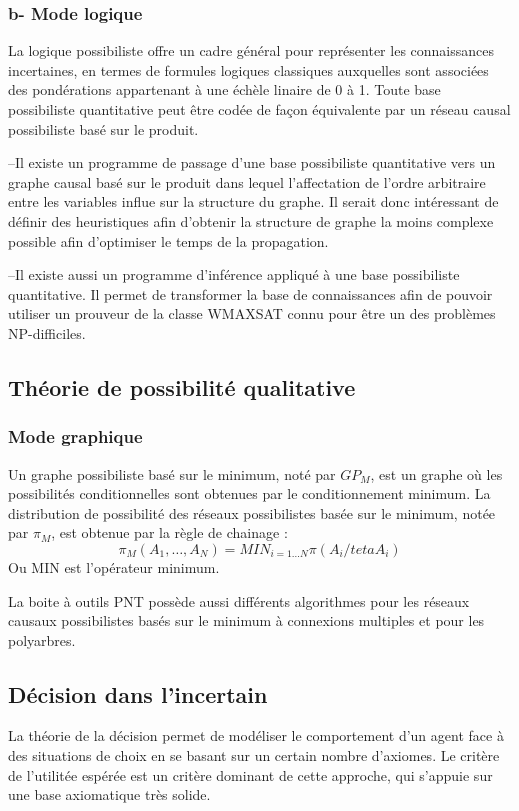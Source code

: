 \subsubsection{b- Mode logique}
La logique possibiliste offre un cadre général pour représenter les connaissances incertaines, en termes de formules logiques classiques auxquelles sont associées des pondérations appartenant à une échèle linaire de 0 à 1. Toute base possibiliste quantitative peut être codée de façon équivalente par un réseau causal possibiliste basé sur le produit.

–Il existe un programme de passage d’une base possibiliste quantitative vers un graphe causal basé sur le produit dans lequel l’affectation de l’ordre arbitraire entre les variables influe sur la structure du graphe. Il serait donc intéressant de définir des heuristiques afin d’obtenir la structure de graphe la moins complexe possible afin d’optimiser
le temps de la propagation.

–Il existe aussi un programme d’inférence appliqué à une base possibiliste quantitative. Il permet de transformer la base de connaissances afin de pouvoir utiliser un prouveur de la classe WMAXSAT connu pour être un des problèmes NP-difficiles\cite{hkhallafiThesis}.

\subsection{Théorie de possibilité qualitative}
\subsubsection{Mode graphique}

Un graphe possibiliste basé sur le minimum, noté par $GP_{M}$, est un graphe où les possibilités conditionnelles sont obtenues par le conditionnement minimum. La distribution de possibilité des réseaux possibilistes basée sur le minimum, notée par $\pi_{M}$, est obtenue par la règle de chainage :
\begin{equation}
 \pi_{M} (A_1, \dots, A_N) = MIN_{i=1 \dots N} \pi (A_i/teta A_i) 
\end{equation}
Ou MIN est  l’opérateur minimum\cite{BoBrDu2008.1}.

La boite à outils PNT possède aussi différents algorithmes pour les réseaux causaux possibilistes basés sur le minimum à connexions multiples et pour les polyarbres. 

\subsection{Décision dans l’incertain}
La théorie de la décision permet de modéliser le comportement d'un agent face
à des situations de choix en se basant sur un certain nombre d'axiomes. Le critère
de l'utilitée espérée est un critère dominant de cette approche, qui s'appuie sur une
base axiomatique très solide\cite{hkhaoulaThesis}.
